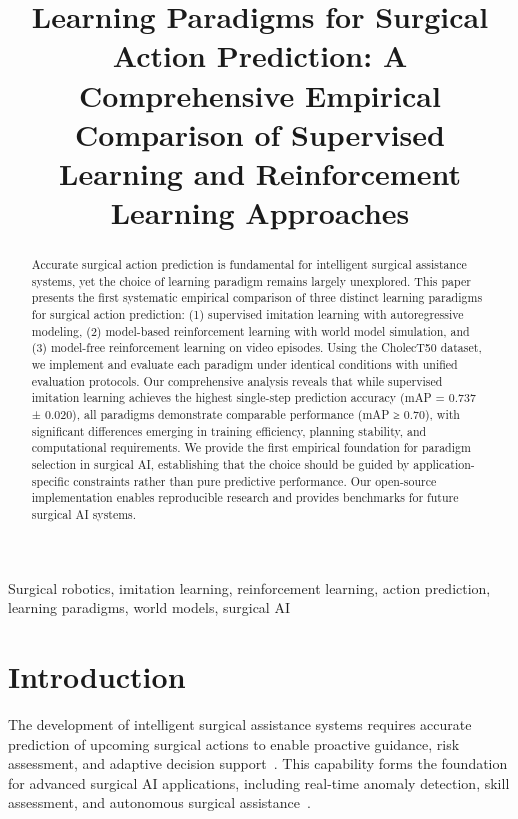 \documentclass[conference]{IEEEtran}
\begin{document}
\title{Learning Paradigms for Surgical Action Prediction: A Comprehensive Empirical Comparison of Supervised Learning and Reinforcement Learning Approaches}

\author{
}

\maketitle

\begin{abstract}
Accurate surgical action prediction is fundamental for intelligent surgical assistance systems, yet the choice of learning paradigm remains largely unexplored. This paper presents the first systematic empirical comparison of three distinct learning paradigms for surgical action prediction: (1) supervised imitation learning with autoregressive modeling, (2) model-based reinforcement learning with world model simulation, and (3) model-free reinforcement learning on video episodes. Using the CholecT50 dataset, we implement and evaluate each paradigm under identical conditions with unified evaluation protocols. Our comprehensive analysis reveals that while supervised imitation learning achieves the highest single-step prediction accuracy (mAP = 0.737 ± 0.020), all paradigms demonstrate comparable performance (mAP ≥ 0.70), with significant differences emerging in training efficiency, planning stability, and computational requirements. We provide the first empirical foundation for paradigm selection in surgical AI, establishing that the choice should be guided by application-specific constraints rather than pure predictive performance. Our open-source implementation enables reproducible research and provides benchmarks for future surgical AI systems.
\end{abstract}

\begin{IEEEkeywords}
Surgical robotics, imitation learning, reinforcement learning, action prediction, learning paradigms, world models, surgical AI
\end{IEEEkeywords}

\section{Introduction}

The development of intelligent surgical assistance systems requires accurate prediction of upcoming surgical actions to enable proactive guidance, risk assessment, and adaptive decision support~\cite{maier2017surgical}. This capability forms the foundation for advanced surgical AI applications, including real-time anomaly detection, skill assessment, and autonomous surgical assistance~\cite{vardazaryan2018systematic}.
\end{document}
